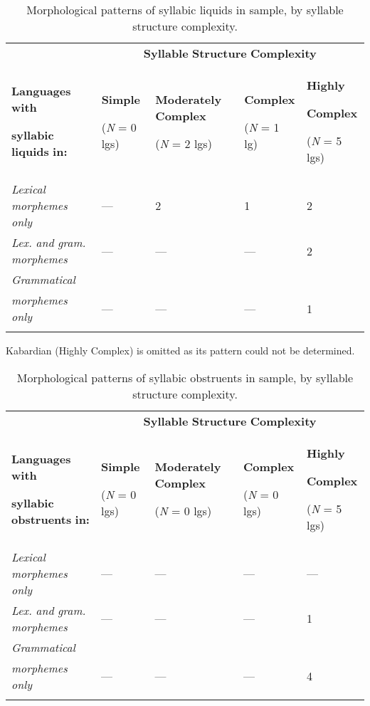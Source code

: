 \begin{table}
\begin{tabularx}{\textwidth}{XXXXX}
 & \multicolumn{4}{c}{ \textbf{Syllable} \textbf{Structure} \textbf{Complexity}}\\
\lsptoprule
{ \textbf{Languages} \textbf{with} }

 \textbf{syllabic} \textbf{liquids} \textbf{in:} & { \textbf{Simple}}

 (\textit{N} = 0 lgs) & { \textbf{Moderately} \textbf{Complex}}

 (\textit{N} = 2 lgs) & { \textbf{Complex}}

 (\textit{N} = 1 lg) & { \textbf{Highly} }

{ \textbf{Complex}}

 (\textit{N} = 5 lgs)\\
 \textit{Lexical} \textit{morphemes} \textit{only} & — & 2 & 1 & 2\\
 \textit{Lex.} \textit{and} \textit{gram.} \textit{morphemes} & — & — & — & 2\\
 \textit{Grammatical} \\
\textit{morphemes} \textit{only} & — & — & — & 1\\
\lspbottomrule
\end{tabularx}
\caption{\label{3.10}Morphological patterns of syllabic liquids in sample, by syllable structure complexity.}Kabardian (Highly Complex) is omitted as its pattern could not be determined.
\end{table}







\begin{table}
\begin{tabularx}{\textwidth}{XXXXX}
 & \multicolumn{4}{c}{ \textbf{Syllable} \textbf{Structure} \textbf{Complexity}}\\
\lsptoprule
{ \textbf{Languages} \textbf{with} }

 \textbf{syllabic} \textbf{obstruents} \textbf{in:} & { \textbf{Simple}}

 (\textit{N} = 0 lgs) & { \textbf{Moderately} \textbf{Complex}}

 (\textit{N} = 0 lgs) & { \textbf{Complex}}

 (\textit{N} = 0 lgs) & { \textbf{Highly} }

{ \textbf{Complex}}

 (\textit{N} = 5 lgs)\\
 \textit{Lexical} \textit{morphemes} \textit{only} & — & — & — & —\\
 \textit{Lex.} \textit{and} \textit{gram.} \textit{morphemes} & — & — & — & 1\\
 \textit{Grammatical} \\
\textit{morphemes} \textit{only} & — & — & — & 4\\
\lspbottomrule
\end{tabularx}
\caption{\label{3.11}Morphological patterns of syllabic obstruents in sample, by syllable structure complexity.}
\end{table}




